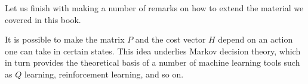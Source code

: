 


Let us finish with making a number of remarks on how to extend the material we covered in this book.

\begin{remark}
It is possible to make the matrix $P$ and the cost vector $H$ depend on an action one can take in certain states. This idea underlies Markov decision theory, which in turn provides the theoretical basis of a number of machine learning tools such as $Q$ learning, reinforcement learning, and so on. 
\end{remark}

